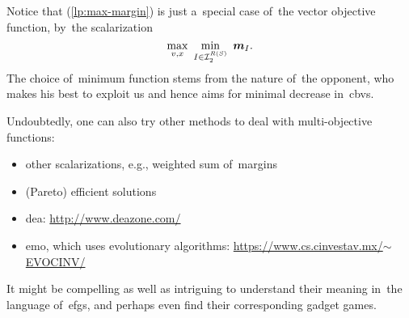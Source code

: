 Notice that (\ref{lp:max-margin}) is just a~special case of~the vector objective function, by~the scalarization
\[
  \max_{v, x}\ \min_{I \in \I_2^{R(S)}}\ {\vect{m}_I}.
\]
The choice of~minimum function stems from the nature of~the opponent, who makes his best to exploit us and hence aims for minimal decrease in~\acrshort{cbv}s.

Undoubtedly, one can also try other methods to deal with multi-objective functions:
\begin{itemize}
  \item other scalarizations, e.g., weighted sum of~margins
  \item (Pareto) efficient solutions
  \item \acrfull{dea}:
    \href{http://www.deazone.com/}{http://www.deazone.com/}
  \item \acrfull{emo}, which uses evolutionary algorithms:
    \href{https://www.cs.cinvestav.mx/~EVOCINV/}{https://www.cs.cinvestav.mx/$\sim$EVOCINV/}
\end{itemize}
It might be compelling as well as intriguing to understand their meaning in~the language of~\acrlong{efg}s, and perhaps even find their corresponding gadget games.
